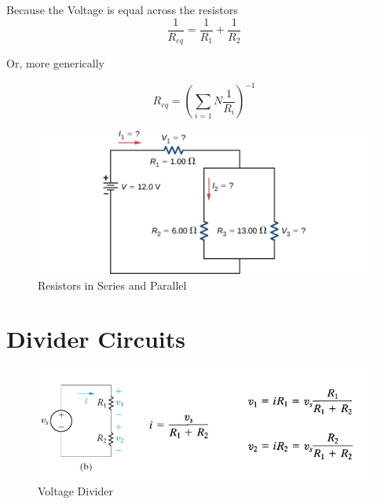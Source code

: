 \documentclass[14pt]{memoir}
\begin{document}
Because the Voltage is equal across the resistors
\begin{equation}
\frac{1}{R_{eq}} = \frac{1}{R_1} + \frac{1}{R_2}
\end{equation}

Or, more generically

\begin{equation}
R_{eq} = (\sum_{i=1}{N} \frac{1}{R_i})^{-1}
\end{equation}



\begin{figure}[H]
\begin{center}
\includegraphics[scale=0.50]{fig/fig_10_16.jpg}
\caption{Resistors in Series and Parallel}
\label{fig:10_16}
\end{center}
\end{figure}


\section{Divider Circuits}

\begin{figure}[H]
\begin{center}
\includegraphics[scale=0.50]{fig/fig03_14.png}
\caption{Voltage Divider}
\label{fig:fig03_14}
\end{center}
\end{figure}
\end{document}
